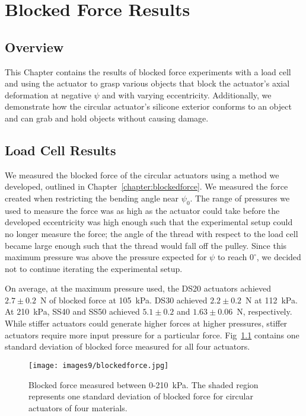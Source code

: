 \chapter{Blocked Force Results}

\section{Overview}

This Chapter contains the results of blocked force experiments with a load cell and using the actuator to grasp various objects that block the actuator's axial deformation at negative $\psi$ and with varying eccentricity. Additionally, we demonstrate how the circular actuator's silicone exterior conforms to an object and can grab and hold objects without causing damage.

\section{Load Cell Results}

We measured the blocked force of the circular actuators using a method we developed, outlined in Chapter~\ref{chapter:blockedforce}. We measured the force created when restricting the bending angle near $\psi_0$. The range of pressures we used to measure the force was as high as the actuator could take before the developed eccentricity was high enough such that the experimental setup could no longer measure the force; the angle of the thread with respect to the load cell became large enough such that the thread would fall off the pulley. Since this maximum pressure was above the pressure expected for $\psi$ to reach $0^\circ$, we decided not to continue iterating the experimental setup. 

On average, at the maximum pressure used, the DS20 actuators achieved $2.7\pm0.2$~N of blocked force at 105~kPa. DS30 achieved $2.2\pm0.2$~N at 112~kPa. At 210~kPa, SS40 and SS50 achieved $5.1\pm0.2$ and $1.63\pm0.06$~N, respectively. While stiffer actuators could generate higher forces at higher pressures, stiffer actuators require more input pressure for a particular force. Fig~\ref{fig:blockedforce} contains one standard deviation of blocked force measured for all four actuators. 

\begin{figure}[!ht]
    \centering
     \texttt{[image: images9/blockedforce.jpg]}
    \caption{Blocked force measured between 0-210~kPa. The shaded region represents one standard deviation of blocked force for circular actuators of four materials.}
    \label{fig:blockedforce}
\end{figure}

